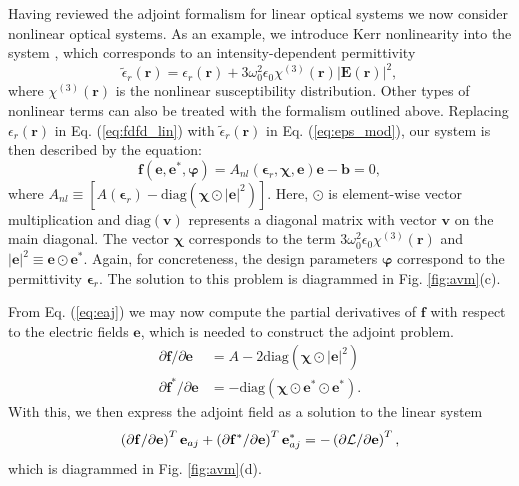 Having reviewed the adjoint formalism for linear optical systems we now consider nonlinear optical systems. As an example, we introduce Kerr nonlinearity into the system \cite{Boyd__2008}, which corresponds to an intensity-dependent permittivity
%
\begin{equation}
\tilde{\epsilon}_r(\mathbf{r}) = \epsilon_r(\mathbf{r}) + 3\omega_0^2 \epsilon_0\chi^{(3)}(\mathbf{r}) \left|\mathbf{E}(\mathbf{r}) \right|^2,
\label{eq:eps_mod}
\end{equation}
%
where $\chi^{(3)}(\mathbf{r})$ is the nonlinear susceptibility distribution. Other types of nonlinear terms can also be treated with the formalism outlined above. Replacing $\epsilon_r(\mathbf{r})$ in Eq. (\ref{eq:fdfd_lin}) with $\tilde{\epsilon}_r(\mathbf{r})$ in Eq. (\ref{eq:eps_mod}), our system is then described by the equation:
%
\begin{equation}
\mathbf{f}(\mathbf{e}, \mathbf{e}^*, \bm{\varphi}) = A_{nl}(\bm{\epsilon}_r, \bm{\chi}, \mathbf{e}) \mathbf{e} - \mathbf{b} = 0,
\label{eq:nl_forward}
\end{equation}
%
where $A_{nl} \equiv \left[ A(\bm{\epsilon}_r) - \textrm{diag}\left( \bm{\chi} \odot |
\mathbf{e}|^2 \right) \right]$.  Here, $\odot$ is element-wise vector multiplication and $\textrm{diag}(\mathbf{v})$ represents a diagonal matrix with vector $\mathbf{v}$ on the main diagonal.  The vector $\bm{\chi}$ corresponds to the term $3\omega_0^2\epsilon_0 \chi^{(3)}(\mathbf{r})$ and
$|\mathbf{e}|^2 \equiv \mathbf{e} \odot \mathbf{e}^*$.  Again, for concreteness, the design parameters $\bm{\varphi}$ correspond to the permittivity $\bm{\epsilon}_r$. The solution to this problem is diagrammed in Fig. \ref{fig:avm}(c).

From Eq. (\ref{eq:eaj}) we may now compute the partial derivatives of $\mathbf{f}$ with respect to the electric fields $\mathbf{e}$, which is needed to construct the adjoint problem.
%
\begin{align}
\partial \mathbf{f} / \partial \mathbf{e} &= A - 2 \textrm{diag}\left( \bm{\chi} \odot |\mathbf{e}|^2  \right)\\
\partial \mathbf{f}^* / \partial \mathbf{e} &= -\textrm{diag}\left( \bm{\chi} \odot \mathbf{e}^* \odot \mathbf{e}^* \right).
\end{align}
%
With this, we then express the adjoint field as a solution to the linear system
%
\begin{equation}
\left( \partial \mathbf{f} / \partial \mathbf{e} \right)^T \mathbf{e}_{aj} + \left( \partial \mathbf{f}^* / \partial \mathbf{e} \right)^T \mathbf{e}_{aj}^* = -\left( \partial \mathcal{L}/\partial \mathbf{e}\right)^T,
\label{eq:adjoint_nonlin}
\end{equation}
%
which is diagrammed in Fig. \ref{fig:avm}(d).

